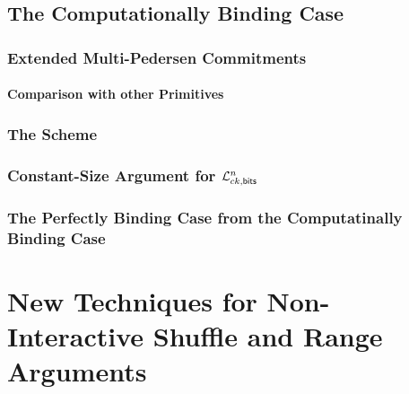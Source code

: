             

    \section{The Computationally Binding Case} \label{sec:bits-non-binding}

        

        \subsection{Extended Multi-Pedersen Commitments} \label{sec:ext-mp}

            

            \subsubsection{Comparison with other Primitives}

                

        \subsection{The Scheme} \label{sec:bits-scheme-nb}

            

        \subsection{Constant-Size Argument for $\mathcal{L}_{ck,\mathsf{bits}}^n$} \label{sec:matr-bits}

            

	\subsection{The Perfectly Binding Case from the Computatinally Binding Case}

		


\chapter{New Techniques for Non-Interactive Shuffle and Range Arguments} \label{sec:shuf-rp}

    

